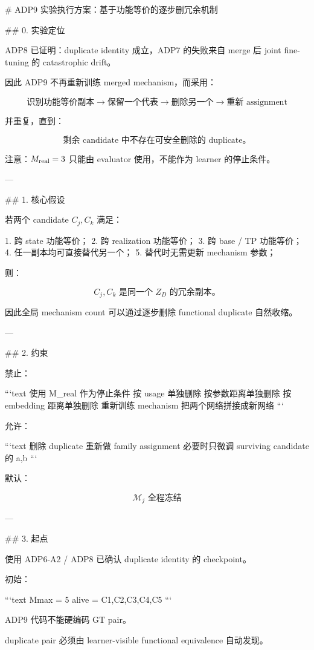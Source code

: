 # ADP9 实验执行方案：基于功能等价的逐步删冗余机制

## 0. 实验定位

ADP8 已证明：duplicate identity 成立，ADP7 的失败来自 merge 后 joint fine-tuning 的 catastrophic drift。

因此 ADP9 不再重新训练 merged mechanism，而采用：

\[
\boxed{
\text{识别功能等价副本}
\rightarrow
\text{保留一个代表}
\rightarrow
\text{删除另一个}
\rightarrow
\text{重新 assignment}
}
\]

并重复，直到：

\[
\boxed{
\text{剩余 candidate 中不存在可安全删除的 duplicate。}
}
\]

注意：\(M_{\rm real}=3\) 只能由 evaluator 使用，不能作为 learner 的停止条件。

---

## 1. 核心假设

若两个 candidate \(C_j,C_k\) 满足：

1. 跨 state 功能等价；
2. 跨 realization 功能等价；
3. 跨 base / TP 功能等价；
4. 任一副本均可直接替代另一个；
5. 替代时无需更新 mechanism 参数；

则：

\[
\boxed{
C_j,C_k
\text{ 是同一个 }Z_D\text{ 的冗余副本。}
}
\]

因此全局 mechanism count 可以通过逐步删除 functional duplicate 自然收缩。

---

## 2. 约束

禁止：

```text
使用 M_real 作为停止条件
按 usage 单独删除
按参数距离单独删除
按 embedding 距离单独删除
重新训练 mechanism
把两个网络拼接成新网络
```

允许：

```text
删除 duplicate
重新做 family assignment
必要时只微调 surviving candidate 的 a,b
```

默认：

\[
\boxed{\mathcal M_j\text{ 全程冻结}}
\]

---

## 3. 起点

使用 ADP6-A2 / ADP8 已确认 duplicate identity 的 checkpoint。

初始：

```text
Mmax = 5
alive = {C1,C2,C3,C4,C5}
```

ADP9 代码不能硬编码 GT pair。

duplicate pair 必须由 learner-visible functional equivalence 自动发现。


